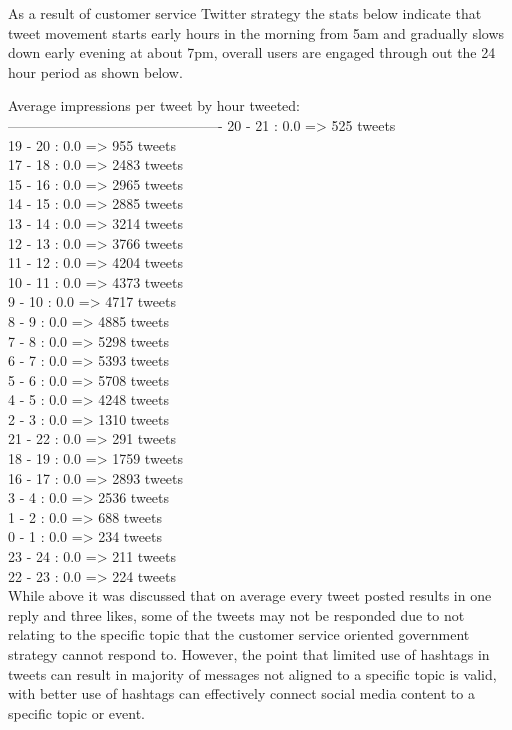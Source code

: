 As a result of customer service Twitter strategy the stats below indicate that tweet movement starts early hours in the morning from 5am and gradually slows down early evening at about 7pm, overall users are engaged through out the 24 hour period as shown below.  

Average impressions per tweet by hour tweeted:
----------------------------------------------
20 - 21 : 0.0 =>  525 tweets\\
19 - 20 : 0.0 =>  955 tweets\\
17 - 18 : 0.0 => 2483 tweets\\
15 - 16 : 0.0 => 2965 tweets\\
14 - 15 : 0.0 => 2885 tweets\\
13 - 14 : 0.0 => 3214 tweets\\
12 - 13 : 0.0 => 3766 tweets\\
11 - 12 : 0.0 => 4204 tweets\\
10 - 11 : 0.0 => 4373 tweets\\
 9 - 10 : 0.0 => 4717 tweets\\
 8 -  9 : 0.0 => 4885 tweets\\
 7 -  8 : 0.0 => 5298 tweets\\
 6 -  7 : 0.0 => 5393 tweets\\
 5 -  6 : 0.0 => 5708 tweets\\
 4 -  5 : 0.0 => 4248 tweets\\
 2 -  3 : 0.0 => 1310 tweets\\
21 - 22 : 0.0 =>  291 tweets\\
18 - 19 : 0.0 => 1759 tweets\\
16 - 17 : 0.0 => 2893 tweets\\
 3 -  4 : 0.0 => 2536 tweets\\
 1 -  2 : 0.0 =>  688 tweets\\
 0 -  1 : 0.0 =>  234 tweets\\
23 - 24 : 0.0 =>  211 tweets\\
22 - 23 : 0.0 =>  224 tweets\\

While above it was discussed that on average every tweet posted results in one reply and three likes, some of the tweets may not be responded due to not relating to the specific topic that the customer service oriented government strategy cannot respond to.  However, the point that limited use of hashtags in tweets can result in majority of messages not aligned to a specific topic is valid, with better use of hashtags can effectively connect social media content to a specific topic or event.

